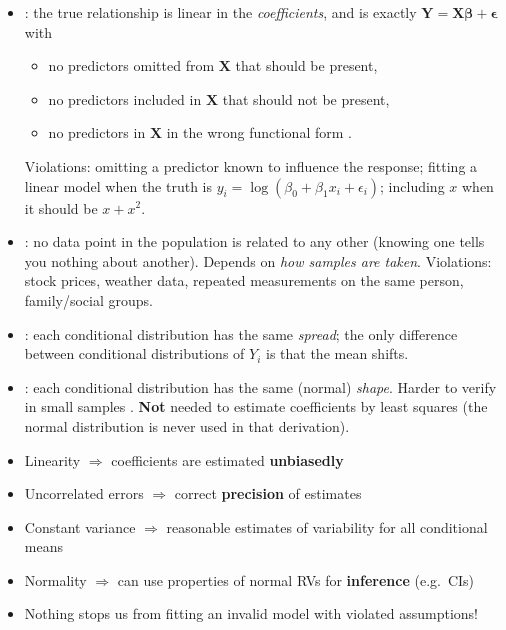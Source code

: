 \begin{itemize}
    \item {}: the true relationship is
    linear in the \emph{coefficients}, and is exactly
    $\mathbf{Y}=\mathbf{X}\boldsymbol\beta+\boldsymbol\epsilon$ with
    \begin{itemize}
        \item no predictors omitted from $\mathbf{X}$ that should be present,
        \item no predictors included in $\mathbf{X}$ that should not be present,
        \item no predictors in $\mathbf{X}$ in the wrong functional form
        .
    \end{itemize}
    Violations: omitting a predictor known to influence the response;
    fitting a linear model when the truth is $y_i=\log(\beta_0+\beta_1x_i+\epsilon_i)$;
    including $x$ when it should be $x+x^2$.
    \item {}: no data point in the population is
    related to any other (knowing one tells you nothing about another).
    Depends on \emph{how samples are taken}. Violations: stock prices,
    weather data, repeated measurements on the same person, family/social
    groups.
    \item {}: each conditional distribution has the
    same \emph{spread}; the only difference between conditional
    distributions of $Y_i$ is that the mean shifts.
    \item {}: each conditional distribution has the same
    (normal) \emph{shape}. Harder to verify in small samples
    . \textbf{Not}
    needed to estimate coefficients by least squares (the normal
    distribution is never used in that derivation).
\end{itemize}

\begin{itemize}
    \item Linearity $\Rightarrow$ coefficients are estimated \textbf{unbiasedly}
    \item Uncorrelated errors $\Rightarrow$ correct \textbf{precision} of estimates
    \item Constant variance $\Rightarrow$ reasonable estimates of variability for all conditional means
    \item Normality $\Rightarrow$ can use properties of normal RVs for \textbf{inference} (e.g.\ CIs)
    \item Nothing stops us from fitting an invalid model with violated assumptions!
\end{itemize}

